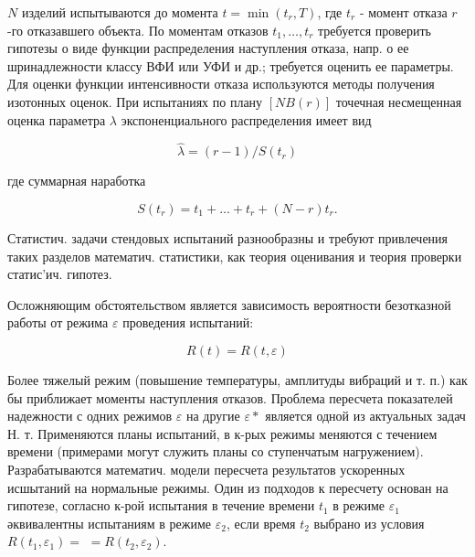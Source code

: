 \documentclass[10pt]{article}
\begin{document}
$N$ изделий испытываются до момента $t=\min \left(t_{r}, T\right)$, где $t_{r}$ - момент отказа $r$-го отказавшего объекта. По моментам отказов $t_{1}, \ldots, t_{r}$ требуется проверить гипотезы о виде функции распределения наступления отказа, напр. о ее шринадлежности классу ВФИ или УФИ и др.; требуется оценить ее параметры. Для оценки функции интенсивности отказа используются методы получения изотонных оценок. При испытаниях по плану $[N B(r)]$ точечная несмещенная оценка параметра $\lambda$ экспоненциального распределения имеет вид



\[

\widehat{\lambda}=(r-1) / S\left(t_{r}\right)

\]



где суммарная наработка



\[

S\left(t_{r}\right)=t_{1}+\ldots+t_{r}+(N-r) t_{r} .

\]



Статистич. задачи стендовых испытаний разнообразны и требуют привлечения таких разделов математич. статистики, как теория оценивания и теория проверки статис'ич. гипотез.



Осложняющим обстоятельством является зависимость вероятности безотказной работы от режима $\varepsilon$ проведения испытаний:



\[

R(t)=R(t, \varepsilon)

\]



Более тяжелый режим (повышение температуры, амплитуды вибраций и т. п.) как бы приближает моменты наступления отказов. Проблема пересчета показателей надежности с одних режимов $\varepsilon$ на другие $\varepsilon *$ является одной из актуальных задач Н. т. Применяются планы испытаний, в к-рых режимы меняются с течением времени (примерами могут служить планы со ступенчатым нагружением). Разрабатываются математич. модели пересчета результатов ускоренных исшытаний на нормальные режимы. Один из подходов к пересчету основан на гипотезе, согласно к-рой испытания в течение времени $t_{1}$ в режиме $\varepsilon_{1}$ әквивалентны испытаниям в режиме $\varepsilon_{2}$, если время $t_{2}$ выбрано из условия $R\left(t_{1}, \varepsilon_{1}\right)=$ $=R\left(t_{2}, \varepsilon_{2}\right)$.
\end{document}
